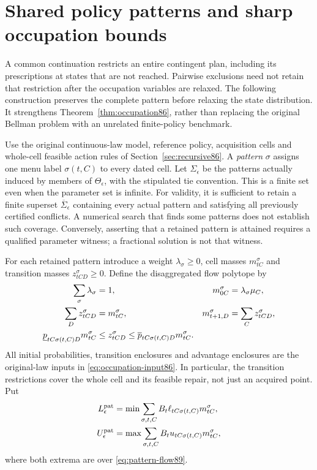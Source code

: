 \section{Shared policy patterns and sharp occupation bounds}\label{sec:pattern89}
A common continuation restricts an entire contingent plan, including its prescriptions at states that are not reached. Pairwise exclusions need not retain that restriction after the occupation variables are relaxed. The following construction preserves the complete pattern before relaxing the state distribution. It strengthens Theorem~\ref{thm:occupation86}, rather than replacing the original Bellman problem with an unrelated finite-policy benchmark.

Use the original continuous-law model, reference policy, acquisition cells and whole-cell feasible action rules of Section~\ref{sec:recursive86}. A \emph{pattern} $\sigma$ assigns one menu label $\sigma(t,C)$ to every dated cell. Let $\Sigma_\epsilon$ be the patterns actually induced by members of $\Theta_\epsilon$, with the stipulated tie convention. This is a finite set even when the parameter set is infinite. For validity, it is sufficient to retain a finite superset $\overline\Sigma_\epsilon$ containing every actual pattern and satisfying all previously certified conflicts. A numerical search that finds some patterns does not establish such coverage. Conversely, asserting that a retained pattern is attained requires a qualified parameter witness; a fractional solution is not that witness.

For each retained pattern introduce a weight $\lambda_\sigma\ge0$, cell masses $m^\sigma_{tC}$ and transition masses $z^\sigma_{tCD}\ge0$. Define the disaggregated flow polytope by
\begin{align}\label{eq:pattern-flow89}
 \sum_\sigma\lambda_\sigma&=1,&
 m^\sigma_{0C}&=\lambda_\sigma\mu_C,\notag\\
 \sum_D z^\sigma_{tCD}&=m^\sigma_{tC},&
 m^\sigma_{t+1,D}&=\sum_C z^\sigma_{tCD},\notag\\
 \underline p_{tC\sigma(t,C)D}m^\sigma_{tC}
 &\le z^\sigma_{tCD}
 \le\overline p_{tC\sigma(t,C)D}m^\sigma_{tC}.&&
\end{align}
All initial probabilities, transition enclosures and advantage enclosures are the original-law inputs in \eqref{eq:occupation-input86}. In particular, the transition restrictions cover the whole cell and its feasible repair, not just an acquired point. Put
\begin{align}\label{eq:pattern-objective89}
 L_\epsilon^{\rm pat}
 &=\min\sum_{\sigma,t,C}B_t\ell_{tC\sigma(t,C)}m^\sigma_{tC},\notag\\
 U_\epsilon^{\rm pat}
 &=\max\sum_{\sigma,t,C}B_tu_{tC\sigma(t,C)}m^\sigma_{tC},
\end{align}
where both extrema are over \eqref{eq:pattern-flow89}.

